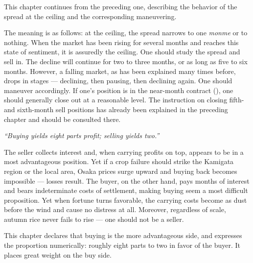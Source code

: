 \commentary
This chapter continues from the preceding one, describing the
behavior of the spread at the ceiling and the corresponding
maneuvering.

The meaning is as follows: at the ceiling, the spread narrows to
one \textit{monme} or to nothing. When the market has been rising for several
months and reaches this state of sentiment, it is assuredly the
ceiling. One should study the spread and sell in. The decline will
continue for two to three months, or as long as five to six months.
However, a falling market, as has been explained many times before,
drops in stages --- declining, then pausing, then declining again.
One should maneuver accordingly. If one's position is in the
near-month contract (), one should generally
close out at a reasonable level. The instruction on closing fifth-
and sixth-month sell positions has already been explained in the
preceding chapter and should be consulted there.


\begin{sokyubox}
{\small\itshape\color{sokyubar} }

\medskip
\textit{``Buying yields eight parts profit; selling yields two.''}

The seller collects interest and, when carrying profits on top,
appears to be in a most advantageous position. Yet if a crop
failure should strike the Kamigata region or the local area,
Osaka prices surge upward and buying back becomes impossible ---
losses result. The buyer, on the other hand, pays months of
interest and bears indeterminate costs of settlement, making
buying seem a most difficult proposition. Yet when fortune turns
favorable, the carrying costs become as dust before the wind and
cause no distress at all. Moreover, regardless of scale, autumn
rice never fails to rise --- one should not be a seller.
\end{sokyubox}

\commentary
This chapter declares that buying is the more advantageous side, and
expresses the proportion numerically: roughly eight parts to two in
favor of the buyer. It places great weight on the buy side.

